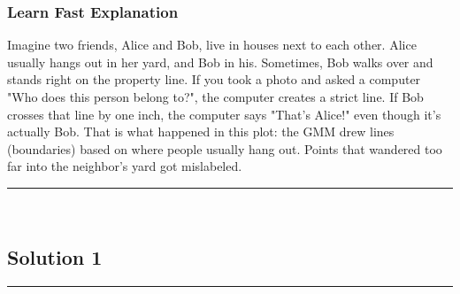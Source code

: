 \documentclass{article}
\begin{document}
\subsubsection*{Learn Fast Explanation}
Imagine two friends, Alice and Bob, live in houses next to each other. Alice usually hangs out in her yard, and Bob in his.
Sometimes, Bob walks over and stands right on the property line. If you took a photo and asked a computer "Who does this person belong to?", the computer creates a strict line. If Bob crosses that line by one inch, the computer says "That's Alice!" even though it's actually Bob.
That is what happened in this plot: the GMM drew lines (boundaries) based on where people usually hang out. Points that wandered too far into the neighbor's yard got mislabeled.

\noindent\rule{\textwidth}{0.4pt}\\

\newpage

\subsection*{Solution 1}
\noindent\rule{\textwidth}{0.4pt}\\
\end{document}
